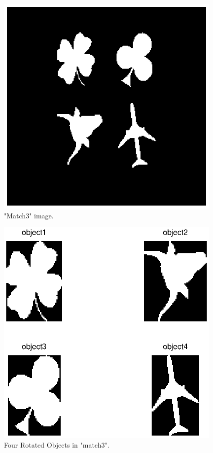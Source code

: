 \documentclass[paper=a4, fontsize=11pt]{scrartcl}
\begin{document}
\begin{figure}
	\centering
	\includegraphics[width=11cm]{match3.eps}
	\caption{ "Match3" image. }
	\label{fig:19}
\end{figure}

\begin{figure}
	\centering
	\includegraphics[width=11cm]{rotated_4object.eps}
	\caption{ Four Rotated Objects in "match3". }
	\label{fig:20}
\end{figure}
\end{document}
